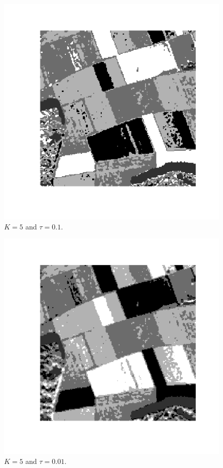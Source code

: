 \documentclass[twoside]{Homework}
\begin{document}
\begin{figure}[!ht]
  \centering
    \includegraphics[scale=0.6]{5-01.png}
  \caption{$K=5$ and $\tau=0.1$.}
\end{figure}
\begin{figure}[!ht]
  \centering
    \includegraphics[scale=0.6]{5-001.png}
  \caption{$K=5$ and $\tau=0.01$.}
\end{figure}
\end{document}
